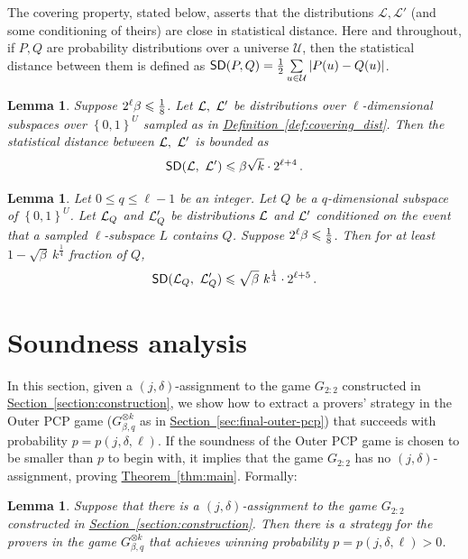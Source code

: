 \documentclass[11pt]{article}
\numberwithin{equation}{section}
\newtheorem{lemma}[theorem]{Lemma}
\theoremstyle{definition}
\theoremstyle{plain}
\newcommand{\expref}[2]{\hyperref[#2]{#1~\ref{#2}}}
\newcommand\card[1]{\left| {#1} \right|}
\newcommand\set[1]{{\left\{ #1 \right\}}}
\newcommand\power[1]{\set{0,1}^{#1}}
\newcommand\eigth{{1\over8}}
\renewcommand\leq{\leqslant}
\begin{document}
The covering property, stated below, asserts that the distributions $\mathcal{L},\mathcal{L}'$ (and some conditioning of theirs)
are close in statistical distance. Here and throughout, if $P, Q$ are probability distributions over a universe $\mathcal{U}$, then
the statistical distance between them is defined as ${\sf SD}(P,Q) = \frac{1}{2}\sum\limits_{u\in\mathcal{U}}\card{P(u) - Q(u)}$.
\begin{lemma}\label{lemma:covering_normal}
Suppose $2^{\ell}\beta \leqslant \eigth$. Let ${\cal L}, ~{\cal L}'$ be distributions over $\ell$-dimensional subspaces over $\power{U}$
 sampled as in \expref{Definition}{def:covering_dist}. Then the statistical
distance between ${\cal L}, ~{\cal L}'$ is bounded as
$$
{\sf SD}({\cal L}, ~{\cal L}')\leqslant  \beta \sqrt{k}\cdot 2^{\ell+4}\,.$$%
\end{lemma}


\begin{lemma}\label{lemma:covering_cond_markov} Let $0 \leq q \leq \ell-1$ be an integer. Let $Q$ be
a $q$-dimensional subspace of $\power{U}$. Let ${\cal L}_Q$ and ${\cal L}'_Q$ be
distributions ${\cal L}$ and ${\cal L}'$ conditioned on the event that a sampled $\ell$-subspace $L$ contains $Q$.
Suppose $2^{\ell}\beta \leqslant \eigth$. Then for at least $1 - \sqrt{\beta}~k^{\frac{1}{4}} $
fraction of $Q$,
\begin{equation}\label{eq:SD_cond_Q}
{\sf SD}  ({\cal L}_Q, ~{\cal L}'_Q ) \leqslant \sqrt{\beta} ~k^{\frac{1}{4}} \cdot 2^{\ell+5}\,.%
\end{equation}
\end{lemma}


\section{Soundness analysis}\label{section:soundness}

In this section, given a $(j,\delta)$-assignment to the game $G_{2:2}$ constructed in \expref{Section}{section:construction},
we show how to extract a
provers' strategy in the Outer PCP game ($G_{\beta, q}^{\otimes k}$ as in \expref{Section}{sec:final-outer-pcp})
that succeeds with probability
$p = p(j, \delta,\ell)$. If the soundness of the Outer PCP
game is chosen to be smaller than $p$ to begin with, it implies that the game $G_{2:2}$ has no $(j,\delta)$-assignment,
proving \expref{Theorem}{thm:main}. Formally:
\begin{lemma}\label{lem:main_soundness}
  Suppose that there is a $(j,\delta)$-assignment to the game $G_{2:2}$ constructed in \expref{Section}{section:construction}.
  Then there is a strategy for the provers in the game $G_{\beta, q}^{\otimes k}$ that achieves winning probability
  $p = p(j,\delta,\ell) > 0$.
\end{lemma}
\end{document}

